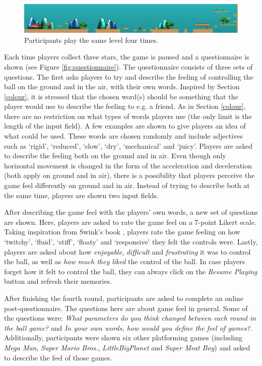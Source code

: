 \begin{figure}[htbp]
\centering
\includegraphics[width=1\textwidth]{Pics/levelStructure}
\caption{Participants play the same level four times.}
\label{fig:level}
\end{figure}

Each time players collect three stars, the game is paused and a questionnaire is shown (see Figure \ref{fig:questionnaire}). The questionnaire consists of three sets of questions. The first asks players to try and describe the feeling of controlling the ball on the ground and in the air, with their own words. Inspired by Section \ref{colour}, it is stressed that the chosen word(s) should be something that the player would use to describe the feeling to e.g. a friend. As in Section \ref{colour}, there are no restriction on what types of words players use (the only limit is the length of the input field). A few examples are shown to give players an idea of what could be used. These words are chosen randomly and include adjectives such as `rigid', `reduced', `slow', `dry', `mechanical' and `juicy'. Players are asked to describe the feeling both on the ground and in air. Even though only horizontal movement is changed in the form of the acceleration and deceleration (both apply on ground and in air), there is a possibility that players perceive the game feel differently on ground and in air. Instead of trying to describe both at the same time, players are shown two input fields.

After describing the game feel with the players' own words, a new set of questions are shown. Here, players are asked to rate the game feel on a 7-point Likert scale. Taking inspiration from Swink's book \cite{swink}, players rate the game feeling on how `twitchy', `fluid', `stiff', `floaty' and `responsive' they felt the controls were. Lastly, players are asked about how \textit{enjoyable}, \textit{difficult} and \textit{frustrating} it was to control the ball, as well as \textit{how much they liked} the control of the ball. In case players forget how it felt to control the ball, they can always click on the \textit{Resume Playing} button and refresh their memories.

After finishing the fourth round, participants are asked to complete an online post-questionnaire. The questions here are about game feel in general. Some of the questions were: \textit{What parameters do you think changed between each round in the ball game?} and \textit{In your own words, how would you define the feel of games?}. Additionally, participants were shown six other platforming games (including \textit{Mega Man}, \textit{Super Mario Bros.}, \textit{LittleBigPlanet} and \textit{Super Meat Boy}) and asked to describe the feel of those games.

